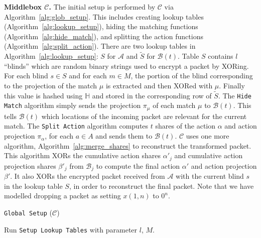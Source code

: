 \RequirePackage{fix-cm} \let\oldvec\vec \documentclass{sig-alternate-05-2015}
\newcommand{\descr}[1]{\smallskip \noindent \textbf{#1}}
\newcommand{\CMB}{\ensuremath{\mbox{$\mathcal{B}$}}}
\newcommand{\TMB}{\ensuremath{\mbox{$\mathcal{C}$}}}
\begin{document}
\descr{Middlebox \texorpdfstring{$\TMB$}{C)}.}
The initial setup is performed by $\TMB$ via Algorithm~\ref{alg:glob_setup}.
This includes creating lookup tables (Algorithm~\ref{alg:lookup_setup}), hiding
the matching functions (Algorithm~\ref{alg:hide_match}), and splitting the
action functions (Algorithm~\ref{alg:split_action}). There are two lookup
tables in Algorithm~\ref{alg:lookup_setup}: $S$ for $\mathcal{A}$ and
$\tilde{S}$ for $\CMB(t)$. Table $S$ contains $l$ ``blinds'' which are random
binary strings used to encrypt a packet by XORing. For each blind $s \in S$ and
for each $m \in M$, the portion of the blind corresponding to the projection of
the match $\mu$ is extracted and then XORed with $\mu$. Finally this value is
hashed using $\mathbb{H}$ and stored in the corresponding row of $\tilde{S}$.
The \texttt{Hide Match} algorithm simply sends the projection $\pi_\mu$ of each
match $\mu$ to $\CMB(t)$. This tells $\CMB(t)$ which locations of the incoming
packet are relevant for the current match. The \texttt{Split Action} algorithm
computes $t$ shares of the action $\alpha$ and action projection $\pi_\alpha$,
for each $a \in A$ and sends them to $\CMB(t)$. $\TMB$ uses one more algorithm,
Algorithm~\ref{alg:merge_shares} to reconstruct the transformed packet. This
algorithm XORs the cumulative action shares $\alpha'_j$ and cumulative action
projection shares $\beta'_j$ from $\CMB_j$ to compute the final action
$\alpha'$ and action projection $\beta'$. It also XORs the
encrypted packet received from $\mathcal{A}$ with the current blind $s$ in the lookup table $S$, in order to
reconstruct the final packet. Note that we have modelled dropping a packet as setting $x(1, n)$ to $0^n$. 

\begin{algorithm}[t]
\caption{\texttt{Global Setup} ($\TMB$)}
\label{alg:glob_setup}
\SetAlgoLined
{}
\SetAlCapSkip{1em}
\DontPrintSemicolon{}
\let\oldnl\nl \newcommand{\nonl}{\renewcommand{\nl}{\let\nl\oldnl}}
\For{$j = 1$ \KwTo $t$}{
	Send $\psi_{\text{priv}}$ to $\CMB_j$. \;
}
Run \texttt{Setup Lookup Tables} with parameter $l$, $M$.\;
\end{algorithm}
\end{document}
